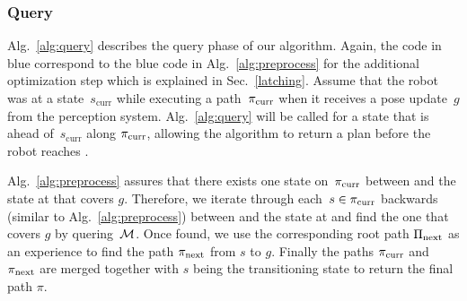 \documentclass[conference]{IEEEtran}
\begin{document}
\subsubsection{Query}
Alg.~\ref{alg:query} describes the query phase of our algorithm. Again, the code in blue correspond to the blue code in Alg.~\ref{alg:preprocess} for the additional optimization step which is explained in Sec.~\ref{latching}.
Assume that the robot was at a state~$s_{\textrm{curr}}$ while executing a path~$\pi_{\rm curr}$ when it receives a pose update~$g$ from the perception system. Alg.~\ref{alg:query} will be called for a state \Sstart that is \Tbound ahead of~$s_{\textrm{curr}}$ along $\pi_{\rm curr}$, allowing the algorithm to return a plan before the robot reaches \Sstart.

Alg.~\ref{alg:preprocess} assures that there exists one state on~$\pi_{\rm curr}$ between \Sstart and the state at \Trc that covers $g$. Therefore, we iterate through each~$s \in \pi_{\rm curr}$ backwards (similar to Alg.~\ref{alg:preprocess}) between \Sstart and the state at \Trc and find the one that covers $g$ by quering~$\mathcal{M}$. Once found, we use the corresponding root path $\Pi_{\rm next}$ as an experience to find the path $\pi_{\rm next}$ from $s$ to $g$. Finally the paths $\pi_{\rm curr}$ and $\pi_{\rm next}$ are merged together with $s$ being the transitioning state to return the final path $\pi$. 
\end{document}
